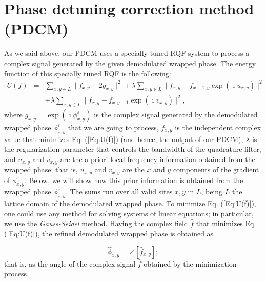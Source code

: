 \section{Phase detuning correction method (PDCM)}
As we said above, our PDCM uses a specially tuned RQF system to process a 
complex signal generated by the given demodulated wrapped phase. The energy
function of this specially tuned RQF is the following:
\begin{eqnarray}\label{Eq:U(f)}
U(f) &=& \sum_{x,y\in L} \mid f_{x,y} - 2 g_{x,y} \mid ^2 +\lambda \sum_{x,y\in
L} \mid f_{x,y} - f_{x-1,y} \exp{\left(\imath u_{x,y}\right)} \mid^2 \nonumber\\
    & & + \lambda \sum_{x,y\in L} \mid f_{x,y} - f_{x,y-1} \exp{\left(\imath
    v_{x,y}\right) } \mid^2,
\end{eqnarray}
where $g_{x,y}= \exp(\imath \phi_{x,y}^\varepsilon)$ is the complex
signal generated by the demodulated wrapped phase $\phi^\varepsilon_{x,y}$
that we are going to process, $f_{x,y}$ is the independent complex value 
that minimizes Eq. (\ref{Eq:U(f)}) (and hence, the output of our PDCM), 
$\lambda$ is the regularization parameter that controls the bandwidth of the 
quadrature filter, and $u_{x,y}$ and $v_{x,y}$ are the a priori local frequency 
information obtained from the wrapped phase; 
that is, $u_{x,y}$ and $v_{x,y}$ are the $x$ and $y$ components of the 
gradient of $\phi^\varepsilon_{x,y}$. 
Below, we will show how this prior information is obtained from the wrapped
phase $\phi^\varepsilon_{x,y}$. The sums run over all valid sites $x,y$ in 
$L$, being $L$ the lattice domain of the demodulated wrapped phase. To minimize 
Eq. (\ref{Eq:U(f)}), one could use any method for solving systems of 
linear equations; in particular, we use the \emph{Gauss-Seidel} method. 
Having the complex field $\hat f$ that minimizes Eq. (\ref{Eq:U(f)}), the 
refined demodulated wrapped phase is obtained as 

\begin{equation}
	\hat{\phi}_{x,y}=\angle[\hat{f}_{x,y}];\label{Eq:phi}
\end{equation}
that is, as the angle of the complex signal $\hat f$ obtained by the
minimization process.

